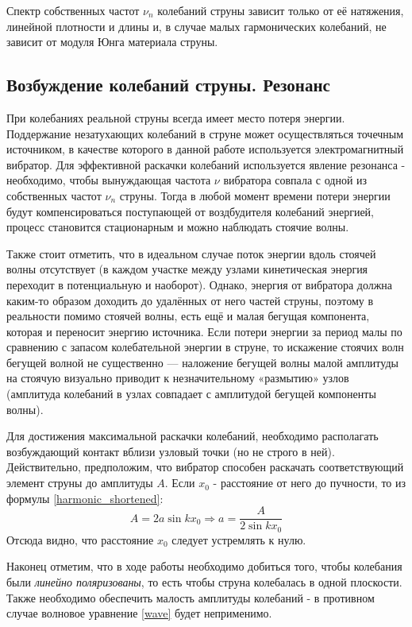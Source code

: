 \documentclass[
a4paper, %
12pt, %
]{article}
\begin{document}
	Спектр собственных частот $\nu_n$ колебаний струны зависит только от её натяжения, линейной плотности и длины и, в случае малых гармонических колебаний, не зависит от модуля Юнга материала струны.
	
	\newpage
	
	\subsection{Возбуждение колебаний струны. Резонанс}
	
	При колебаниях реальной струны всегда имеет место потеря энергии. Поддержание незатухающих
	колебаний в струне может осуществляться точечным источником, в качестве которого в данной работе используется электромагнитный вибратор. 
	Для эффективной раскачки колебаний используется явление резонанса - необходимо, чтобы вынуждающая частота $\nu$ вибратора совпала с одной из собственных частот $\nu_n$ струны. Тогда в любой момент времени потери энергии будут компенсироваться поступающей от воздбудителя колебаний энергией, процесс становится стационарным и можно наблюдать стоячие волны.
	
	Также стоит отметить, что в идеальном случае поток энергии вдоль стоячей волны отсутствует (в каждом участке между узлами кинетическая энергия переходит в потенциальную и наоборот). Однако, энергия от вибратора должна каким-то образом доходить до удалённых от него частей струны, поэтому в реальности помимо стоячей волны, есть ещё и малая бегущая компонента, которая и переносит энергию источника. Если потери энергии за период малы по сравнению с запасом колебательной энергии в струне, то искажение стоячих волн бегущей волной не существенно — наложение бегущей волны малой амплитуды на стоячую визуально приводит к незначительному «размытию» узлов (амплитуда колебаний в узлах совпадает с амплитудой бегущей компоненты волны).
	
	Для достижения максимальной раскачки колебаний, необходимо располагать возбуждающий контакт вблизи узловый точки (но не строго в ней). Действительно, предположим, что вибратор способен раскачать соответствующий элемент струны до амплитуды $A$. Если $x_0$ - расстояние от него до пучности, то из формулы \eqref{harmonic_shortened}:
	\[A = 2a \sin{kx_0} \Rightarrow a = \frac{A}{2\sin{kx_0}} \]
	Отсюда видно, что расстояние $x_0$ следует устремлять к нулю.
	
	Наконец отметим, что в ходе работы необходимо добиться того, чтобы колебания были \textit{линейно поляризованы}, то есть чтобы струна колебалась в одной плоскости. Также необходимо обеспечить малость амплитуды колебаний - в противном случае волновое уравнение \eqref{wave} будет неприменимо.
		
\end{document}
